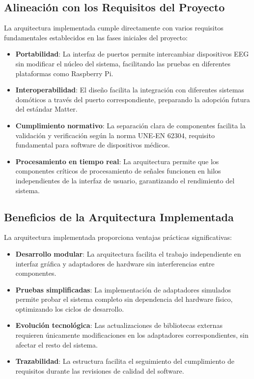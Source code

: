 \subsection{Alineación con los Requisitos del Proyecto}

La arquitectura implementada cumple directamente con varios requisitos fundamentales establecidos en las fases iniciales del proyecto:

\begin{itemize}
    \item \textbf{Portabilidad}: La interfaz de puertos permite intercambiar dispositivos EEG sin modificar el núcleo del sistema, facilitando las pruebas en diferentes plataformas como Raspberry Pi.
    
    \item \textbf{Interoperabilidad}: El diseño facilita la integración con diferentes sistemas domóticos a través del puerto correspondiente, preparando la adopción futura del estándar Matter.
    
    \item \textbf{Cumplimiento normativo}: La separación clara de componentes facilita la validación y verificación según la norma UNE-EN 62304, requisito fundamental para software de dispositivos médicos.
    
    \item \textbf{Procesamiento en tiempo real}: La arquitectura permite que los componentes críticos de procesamiento de señales funcionen en hilos independientes de la interfaz de usuario, garantizando el rendimiento del sistema.
\end{itemize}

\subsection{Beneficios de la Arquitectura Implementada}

La arquitectura implementada proporciona ventajas prácticas significativas:

\begin{itemize}
    \item \textbf{Desarrollo modular}: La arquitectura facilita el trabajo independiente en interfaz gráfica y adaptadores de hardware sin interferencias entre componentes.
    
    \item \textbf{Pruebas simplificadas}: La implementación de adaptadores simulados permite probar el sistema completo sin dependencia del hardware físico, optimizando los ciclos de desarrollo.
    
    \item \textbf{Evolución tecnológica}: Las actualizaciones de bibliotecas externas requieren únicamente modificaciones en los adaptadores correspondientes, sin afectar el resto del sistema.
    
    \item \textbf{Trazabilidad}: La estructura facilita el seguimiento del cumplimiento de requisitos durante las revisiones de calidad del software.
\end{itemize}

